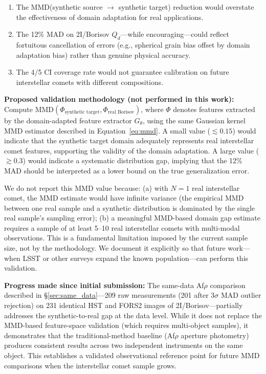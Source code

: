 \documentclass[usenatbib]{mnras}
\begin{document}
\begin{enumerate}
    \item The MMD(synthetic source $\to$ synthetic target) reduction would overstate the effectiveness of domain adaptation for real applications.
    \item The 12\% MAD on 2I/Borisov $Q_d$---while encouraging---could reflect fortuitous cancellation of errors (e.g., spherical grain bias offset by domain adaptation bias) rather than genuine physical accuracy.
    \item The 4/5 CI coverage rate would not guarantee calibration on future interstellar comets with different compositions.
\end{enumerate}

\textbf{Proposed validation methodology (not performed in this work):} Compute $\text{MMD}(\Phi_{\text{synthetic target}}, \Phi_{\text{real Borisov}})$, where $\Phi$ denotes features extracted by the domain-adapted feature extractor $G_\theta$, using the same Gaussian kernel MMD estimator described in Equation~\ref{eq:mmd}. A small value ($\lesssim 0.15$) would indicate that the synthetic target domain adequately represents real interstellar comet features, supporting the validity of the domain adaptation. A large value ($\gtrsim 0.3$) would indicate a systematic distribution gap, implying that the 12\% MAD should be interpreted as a lower bound on the true generalization error.

We do not report this MMD value because: (a) with $N=1$ real interstellar comet, the MMD estimate would have infinite variance (the empirical MMD between one real sample and a synthetic distribution is dominated by the single real sample's sampling error); (b) a meaningful MMD-based domain gap estimate requires a sample of at least 5--10 real interstellar comets with multi-modal observations. This is a fundamental limitation imposed by the current sample size, not by the methodology. We document it explicitly so that future work---when LSST or other surveys expand the known population---can perform this validation.

\textbf{Progress made since initial submission:} The same-data Af$\rho$ comparison described in \S\ref{sec:same_data}---209 raw measurements (201 after 3$\sigma$ MAD outlier rejection) on 231 identical HST and FORS2 images of 2I/Borisov---partially addresses the synthetic-to-real gap at the data level. While it does not replace the MMD-based feature-space validation (which requires multi-object samples), it demonstrates that the traditional-method baseline (Af$\rho$ aperture photometry) produces consistent results across two independent instruments on the same object. This establishes a validated observational reference point for future MMD comparisons when the interstellar comet sample grows.
\end{document}
